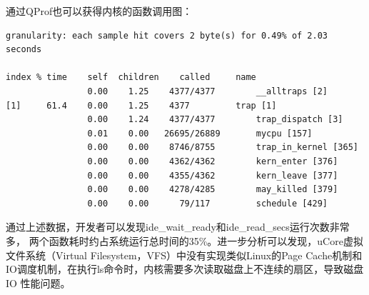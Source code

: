 	通过QProf也可以获得内核的函数调用图：
	{\tiny
	\begin{Verbatim}[frame=single]
granularity: each sample hit covers 2 byte(s) for 0.49% of 2.03 seconds

index % time    self  children    called     name
                0.00    1.25    4377/4377        __alltraps [2]
[1]     61.4    0.00    1.25    4377         trap [1]
                0.00    1.24    4377/4377        trap_dispatch [3]
                0.01    0.00   26695/26889       mycpu [157]
                0.00    0.00    8746/8755        trap_in_kernel [365]
                0.00    0.00    4362/4362        kern_enter [376]
                0.00    0.00    4355/4362        kern_leave [377]
                0.00    0.00    4278/4285        may_killed [379]
                0.00    0.00      79/117         schedule [429]
	\end{Verbatim}
	}

	通过上述数据，开发者可以发现ide\_wait\_ready和ide\_read\_secs运行次数非常多，
两个函数耗时约占系统运行总时间的35\%。进一步分析可以发现，uCore虚拟文件系统（Virtual
Filesystem，VFS）中没有实现类似Linux的Page
Cache机制和IO调度机制，在执行ls命令时，内核需要多次读取磁盘上不连续的扇区，导致磁盘IO
性能问题。

